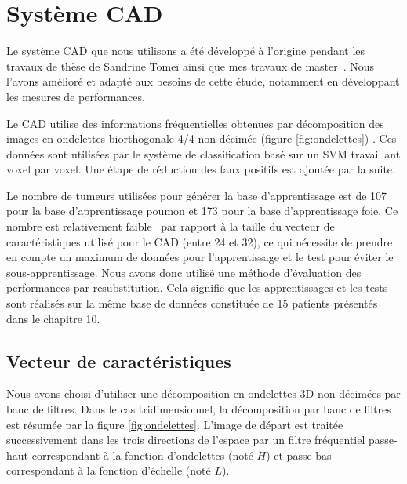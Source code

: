 \section{Système CAD} %

Le système CAD que nous utilisons a été développé à l'origine pendant les travaux de thèse de Sandrine Tomeï ainsi que mes travaux de master~\cite{tomei2008automatic,lartizien2010impact}. Nous l'avons amélioré et adapté aux besoins de cette étude, notamment en développant les mesures de performances.


Le CAD utilise des informations fréquentielles obtenues par décomposition des images en ondelettes biorthogonale 4/4 non décimée (figure \ref{fig:ondelettes}) . Ces données sont utilisées par le système de classification basé sur un SVM travaillant voxel par voxel. Une étape de réduction des faux positifs est ajoutée par la suite.

Le nombre de tumeurs utilisées pour générer la base d'apprentissage est de 107 pour la base d'apprentissage poumon et 173 pour la base d'apprentissage foie. Ce nombre est relativement faible~\cite{hua2005optimal} par rapport à la taille du vecteur de caractéristiques utilisé pour le CAD (entre 24 et 32), ce qui nécessite de prendre en compte un maximum de données pour l'apprentissage et le test pour éviter le sous-apprentissage. Nous avons donc utilisé une méthode d'évaluation des performances par resubstitution. Cela signifie que les apprentissages et les tests sont réalisés sur la même base de données constituée de 15 patients présentés dans le chapitre 10. %

\subsection{Vecteur de caractéristiques}

Nous avons choisi d’utiliser une décomposition en ondelettes 3D non décimées par banc de filtres. Dans le cas tridimensionnel, la décomposition par banc de filtres est résumée par la figure \ref{fig:ondelettes}. L’image de départ est traitée successivement dans les trois directions de l’espace par un filtre fréquentiel passe-haut correspondant à la fonction d’ondelettes (noté $H$) et passe-bas correspondant à la fonction d’échelle (noté $L$). 

